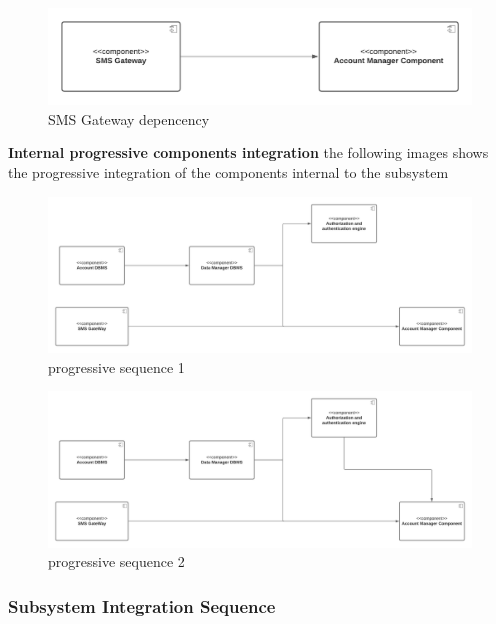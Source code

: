 \begin{itemize}
    \begin{figure}[h!]
        \centering
        \includegraphics[width=.8\textwidth]{Images/TestDiagram/Account/ExternalDependenciesSMS.png}
        \caption{\label{fig:AccountExternalDepSMS}{SMS Gateway depencency}}
    \end{figure}
    \FloatBarrier  
    \textbf{Internal progressive components integration}
    the following images shows the progressive integration of the components internal to the subsystem
        \begin{figure}[h!]
        \centering
        \includegraphics[width=1\textwidth]{Images/TestDiagram/Account/subAccount1.png}
        \caption{\label{fig:progressiveAccount1}{progressive sequence 1}}
    \end{figure}
    \FloatBarrier 
    \begin{figure}[h!]
        \centering
        \includegraphics[width=1\textwidth]{Images/TestDiagram/Account/subAccount2.png}
        \caption{\label{fig:progressiveAccount1}{progressive sequence 2}}
    \end{figure}
    \FloatBarrier 

\end{itemize}


\subsubsection{Subsystem Integration Sequence}
\label{subsect: subsytemintegrationsequence}

